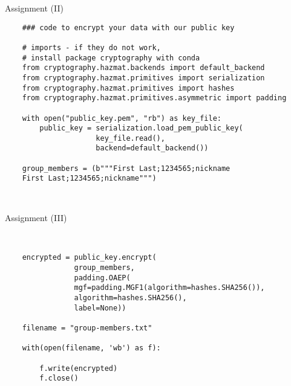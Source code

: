 \begin{frame}[fragile]{Assignment (II)}
	
	\begin{verbatim}
	### code to encrypt your data with our public key
	
	# imports - if they do not work,
	# install package cryptography with conda
	from cryptography.hazmat.backends import default_backend
	from cryptography.hazmat.primitives import serialization
	from cryptography.hazmat.primitives import hashes
	from cryptography.hazmat.primitives.asymmetric import padding
	
	with open("public_key.pem", "rb") as key_file:
	    public_key = serialization.load_pem_public_key(
	                 key_file.read(),
	                 backend=default_backend())
		
	group_members = (b"""First Last;1234565;nickname
    First Last;1234565;nickname""")
	
	
	\end{verbatim}
	
\end{frame}

\begin{frame}[fragile]{Assignment (III)}
	
	\begin{verbatim}
	
	
	encrypted = public_key.encrypt(
                group_members,
                padding.OAEP(
                mgf=padding.MGF1(algorithm=hashes.SHA256()),
                algorithm=hashes.SHA256(),
                label=None))
	
	filename = "group-members.txt"
	
	with(open(filename, 'wb') as f):
	
		f.write(encrypted)
		f.close()
	
	\end{verbatim}
	
	\end{frame}


